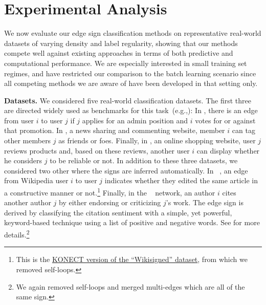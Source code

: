 \section{Experimental Analysis}\label{s:exp}
We now evaluate our edge sign classification methods on representative real-world datasets of varying density and label regularity,
showing that our methods compete well against existing approaches in terms of both predictive and computational performance. We are especially interested in small training set regimes, and have restricted our comparison to the batch learning scenario since all competing methods we are aware of have been developed in that setting only.

{\bf Datasets.} We considered five real-world classification datasets. The first three are directed \ssn{} widely used as benchmarks for this task~(e.g.,\cite{Leskovec2010,shahriari2014ranking,wu2016troll}): In \wik{}, there is an edge from user $i$ to user $j$ if $j$ applies for an admin position and $i$ votes for or against that promotion. In \sla{}, a news sharing and commenting website, member $i$ can tag other members $j$ as friends or foes. Finally, in \epi{}, an online shopping website, user $j$ reviews products and, based on these reviews, another user $i$ can display whether he considers $j$ to be reliable or not. In addition to these three datasets, we considered two other \ssn{} where the signs are inferred automatically.
In \kiw{}~\cite{wikiedits11}, an edge from Wikipedia user $i$ to user $j$ indicates whether they edited the same article in a constructive manner or not.\footnote
{
This is the \href{http://konect.uni-koblenz.de/networks/wikisigned-k2}{KONECT version of
the \enquote{Wikisigned} dataset}, from which we removed self-loops.
}
Finally, in the \aut{}~\cite{kumar2016structure} network, an author $i$ cites another author $j$ by either endorsing or criticizing $j$'s work. The edge sign is derived by classifying the citation sentiment with a simple, yet powerful, keyword-based technique using a list of positive and negative words. See \cite{kumar2016structure} for more details.\footnote{
We again removed self-loops and merged multi-edges which are all of the same sign.
}

